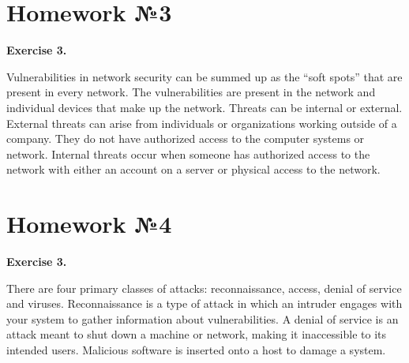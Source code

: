 \documentclass[a4paper,12pt]{article}
\begin{document}
\section{Homework №3}

\textbf{Exercise 3.}

Vulnerabilities in network security can be summed up as the “soft spots” that are present in every network. The vulnerabilities are present in the network and individual devices that make up the network. Threats can be internal or external. External threats can arise from individuals or organizations working outside of a company. They do not have authorized access to the computer systems or network. Internal threats occur when someone has authorized access to the network with either an account on a server or physical access to the network.

\section{Homework №4}

\textbf{Exercise 3.}

There are four primary classes of attacks: reconnaissance, access, denial of service and viruses.
Reconnaissance is a type of attack in which an intruder engages with your system to gather information about vulnerabilities. A denial of service is an attack meant to shut down a machine or network, making it inaccessible to its intended users. Malicious software is inserted onto a host to damage a system.
\end{document}
